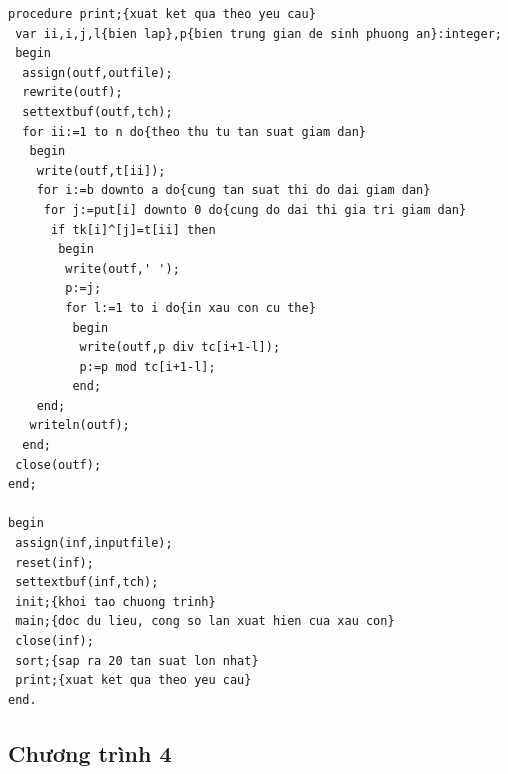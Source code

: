 \documentclass[11pt]{article}
\begin{document}
\begin{verbatim}
procedure print;{xuat ket qua theo yeu cau}
 var ii,i,j,l{bien lap},p{bien trung gian de sinh phuong an}:integer;
 begin
  assign(outf,outfile);
  rewrite(outf);
  settextbuf(outf,tch);
  for ii:=1 to n do{theo thu tu tan suat giam dan}
   begin
    write(outf,t[ii]);
    for i:=b downto a do{cung tan suat thi do dai giam dan}
     for j:=put[i] downto 0 do{cung do dai thi gia tri giam dan}
      if tk[i]^[j]=t[ii] then
       begin
        write(outf,' ');
        p:=j;
        for l:=1 to i do{in xau con cu the}
         begin
          write(outf,p div tc[i+1-l]);
          p:=p mod tc[i+1-l];
         end;
    end;
   writeln(outf);
  end;
 close(outf);
end;

begin
 assign(inf,inputfile);
 reset(inf);
 settextbuf(inf,tch);
 init;{khoi tao chuong trinh}
 main;{doc du lieu, cong so lan xuat hien cua xau con}
 close(inf);
 sort;{sap ra 20 tan suat lon nhat}
 print;{xuat ket qua theo yeu cau}
end.
\end{verbatim}

\subsection*{Chương trình 4}
\end{document}
